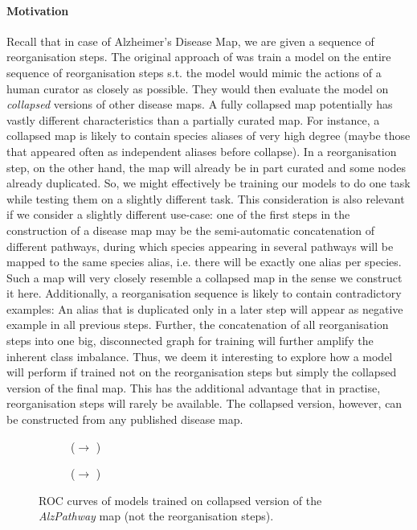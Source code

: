 \documentclass[
	fontsize=10pt, %
	twoside=false, %
	secnumdepth=1, %
  toc=indentunnumbered %
]{kaobook}
\begin{document}
\paragraph{Motivation} Recall that in case of Alzheimer's Disease Map, we are
given a sequence of reorganisation steps. The original approach of \nielsen was
train a model on the entire sequence of reorganisation steps s.t. the model
would mimic the actions of a human curator as closely as possible. They would
then evaluate the model on \textit{collapsed} versions of other disease maps.
%
A fully collapsed map potentially has vastly different characteristics than a
partially curated map. For instance, a collapsed map is likely to contain
species aliases of very high degree (maybe those that appeared often as
independent aliases before collapse). In a reorganisation step, on the other
hand, the map will already be in part curated and some nodes already duplicated.
%
So, we might effectively be training our models to do one task while testing
them on a slightly different task.
%
This consideration is also relevant if we consider a slightly different
use-case: one of the first steps in the construction of a disease map may be the
semi-automatic concatenation of different pathways, during which species
appearing in several pathways will be mapped to the same species alias, i.e.
there will be exactly one alias per species. Such a map will very closely
resemble a collapsed map in the sense we construct it here.
%
Additionally, a reorganisation sequence is likely to contain contradictory
examples: An alias that is duplicated only in a later step will appear as
negative example in all previous steps. Further, the concatenation of all
reorganisation steps into one big, disconnected graph for training
will further amplify the inherent class imbalance.
%
Thus, we deem it interesting to explore how a model will perform if trained not
on the reorganisation steps but simply the collapsed version of the final map.
%
This has the additional advantage that in practise, reorganisation steps will
rarely be available. The collapsed version, however, can be constructed from any
published disease map.

\begin{figure}[h]
  \centering
  \begin{subfigure}[h]{0.48\linewidth}
    \caption{(\ADLast $\rightarrow$ \PDMap)}
  \end{subfigure}
  \begin{subfigure}[h]{0.48\linewidth}
    \caption{(\ADLast $\rightarrow$ \ReconMap)}
  \end{subfigure}
  \caption{ROC curves of models trained on collapsed version of the
    \textit{AlzPathway} map (not the reorganisation steps).}
  \label{fig:importance-reorganisation-steps}
\end{figure}
\end{document}

